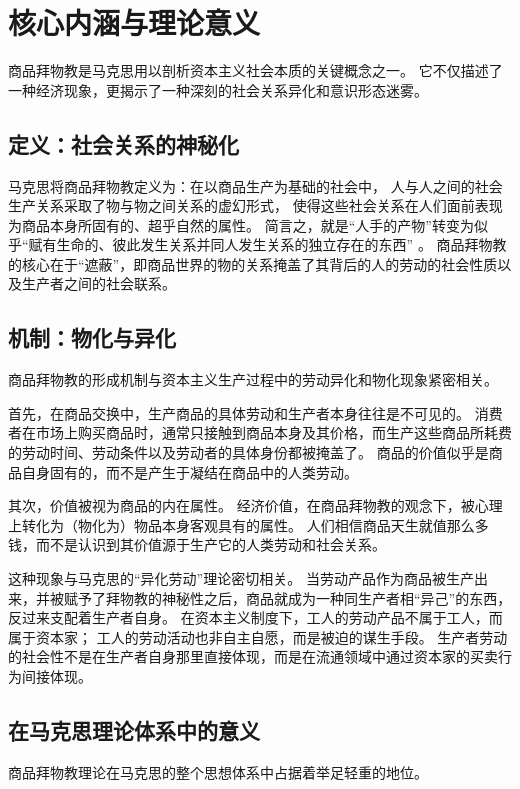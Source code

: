 \section{核心内涵与理论意义}
商品拜物教是马克思用以剖析资本主义社会本质的关键概念之一。
它不仅描述了一种经济现象，更揭示了一种深刻的社会关系异化和意识形态迷雾。
\subsection{定义：社会关系的神秘化}
马克思将商品拜物教定义为：在以商品生产为基础的社会中，
人与人之间的社会生产关系采取了物与物之间关系的虚幻形式，
使得这些社会关系在人们面前表现为商品本身所固有的、超乎自然的属性。
简言之，就是“人手的产物”转变为似乎“赋有生命的、彼此发生关系并同人发生关系的独立存在的东西” 。
商品拜物教的核心在于“遮蔽”，即商品世界的物的关系掩盖了其背后的人的劳动的社会性质以及生产者之间的社会联系\autocite{zheng2022fetishism}。
\subsection{机制：物化与异化}
商品拜物教的形成机制与资本主义生产过程中的劳动异化和物化现象紧密相关。

首先，在商品交换中，生产商品的具体劳动和生产者本身往往是不可见的。
消费者在市场上购买商品时，通常只接触到商品本身及其价格，而生产这些商品所耗费的劳动时间、劳动条件以及劳动者的具体身份都被掩盖了。
商品的价值似乎是商品自身固有的，而不是产生于凝结在商品中的人类劳动。

其次，价值被视为商品的内在属性。
经济价值，在商品拜物教的观念下，被心理上转化为（物化为）物品本身客观具有的属性。
人们相信商品天生就值那么多钱，而不是认识到其价值源于生产它的人类劳动和社会关系。

这种现象与马克思的“异化劳动”理论密切相关。
当劳动产品作为商品被生产出来，并被赋予了拜物教的神秘性之后，商品就成为一种同生产者相“异己”的东西，反过来支配着生产者自身。
在资本主义制度下，工人的劳动产品不属于工人，而属于资本家；
工人的劳动活动也非自主自愿，而是被迫的谋生手段。
生产者劳动的社会性不是在生产者自身那里直接体现，而是在流通领域中通过资本家的买卖行为间接体现。


\subsection{在马克思理论体系中的意义}
商品拜物教理论在马克思的整个思想体系中占据着举足轻重的地位。

